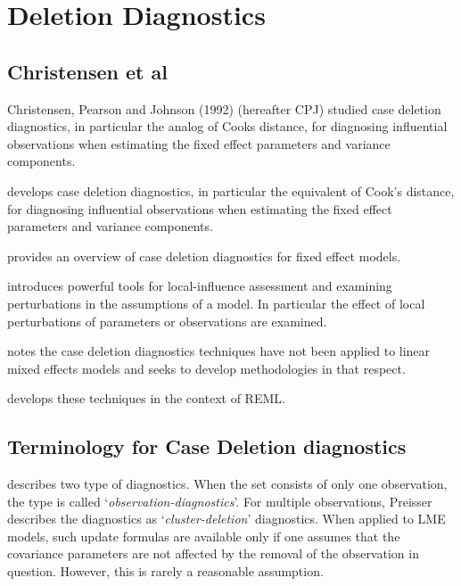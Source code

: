 \documentclass[12pt, a4paper]{report}
\theoremstyle{plain}
\theoremstyle{definition}
\theoremstyle{remark}
\begin{document}
\chapter{Deletion Diagnostics}

\section{Christensen et al}         %
Christensen, Pearson and Johnson (1992) (hereafter CPJ) studied case deletion diagnostics, in particular the analog of Cooks
distance, for diagnosing influential observations when estimating
the fixed effect parameters and variance
components.

\citet{Christensen} develops  case deletion diagnostics, in particular the equivalent of  Cook's distance, for diagnosing influential observations when estimating the fixed effect parameters and variance components.


\citet{Christensen} provides an overview of case deletion
diagnostics for fixed effect models.

\citet{cook86} introduces powerful tools for local-influence
assessment and examining perturbations in the assumptions of a
model. In particular the effect of local perturbations of
parameters or observations are examined.

\citet{Christensen} notes the case deletion diagnostics
techniques have not been applied to linear mixed effects models
and seeks to develop methodologies in that respect.

\citet{Christensen} develops these techniques in the context of
REML.



\section{Terminology for Case Deletion diagnostics} %

\citet{preisser} describes two type of diagnostics. When the set consists of only one observation, the type is called
`\textit{observation-diagnostics}'. For multiple observations, Preisser describes the diagnostics as `\textit{cluster-deletion}' diagnostics. When applied to LME models, such update formulas are available only if one assumes that the covariance parameters are not affected by the removal of the observation in question. However, this is rarely a reasonable assumption.
\end{document}
